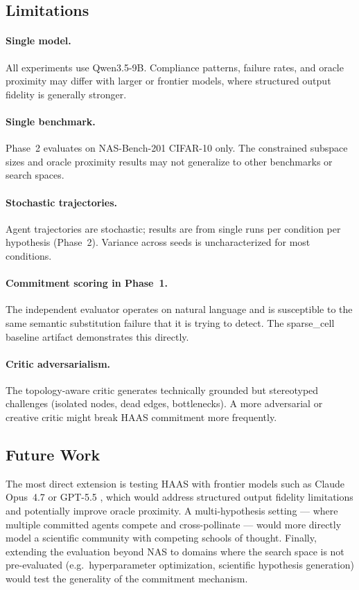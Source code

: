 \documentclass[10pt]{article}
\newcommand{\haas}{\textsc{HAAS}}
\newcommand{\nasbench}{NAS-Bench-201}
\begin{document}
\subsection{Limitations}
\label{sec:limitations}

\paragraph{Single model.} All experiments use Qwen3.5-9B. Compliance patterns,
failure rates, and oracle proximity may differ with larger or frontier models,
where structured output fidelity is generally stronger.

\paragraph{Single benchmark.} Phase~2 evaluates on \nasbench{} CIFAR-10 only.
The constrained subspace sizes and oracle proximity results may not generalize
to other benchmarks or search spaces.

\paragraph{Stochastic trajectories.} Agent trajectories are stochastic; results
are from single runs per condition per hypothesis (Phase~2). Variance across
seeds is uncharacterized for most conditions.

\paragraph{Commitment scoring in Phase~1.} The independent evaluator operates
on natural language and is susceptible to the same semantic substitution
failure that it is trying to detect. The sparse\_cell baseline artifact
demonstrates this directly.

\paragraph{Critic adversarialism.} The topology-aware critic generates
technically grounded but stereotyped challenges (isolated nodes, dead edges,
bottlenecks). A more adversarial or creative critic might break \haas{}
commitment more frequently.

\subsection{Future Work}

The most direct extension is testing \haas{} with frontier models such as
Claude Opus~4.7 \citep{anthropic2026opus47} or GPT-5.5 \citep{openai2026gpt55},
which would address structured output fidelity limitations and potentially
improve oracle proximity. A multi-hypothesis setting ---
where multiple committed agents compete and cross-pollinate --- would more directly
model a scientific community with competing schools of thought. Finally, extending
the evaluation beyond NAS to domains where the search space is not pre-evaluated
(e.g.\ hyperparameter optimization, scientific hypothesis generation) would test
the generality of the commitment mechanism.
\end{document}
